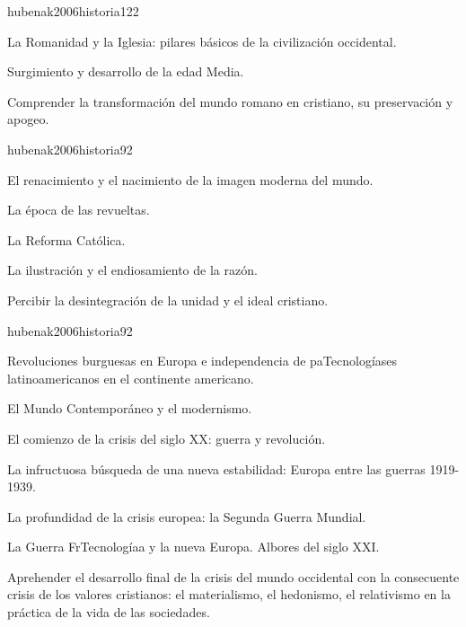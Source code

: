 \begin{syllabus}
\begin{unit}{}{hubenak2006historia}{12}{2}
\begin{topics}
	\item La Romanidad y la Iglesia: pilares básicos de la civilización occidental. 	
	\item Surgimiento y desarrollo de la edad Media.
\end{topics}
\begin{learningoutcomes}
	\item Comprender la transformación del mundo romano en cristiano, su preservación y apogeo.
\end{learningoutcomes}
\end{unit}

\begin{unit}{}{hubenak2006historia}{9}{2}
\begin{topics}
	\item El renacimiento y el nacimiento de la imagen moderna del mundo.  	
	\item La época de las revueltas. 	
	\item La Reforma Católica. 	
	\item La ilustración y el endiosamiento de la razón. 
\end{topics}
\begin{learningoutcomes}
	\item Percibir la desintegración de la unidad y el ideal cristiano.
\end{learningoutcomes}
\end{unit}

\begin{unit}{}{hubenak2006historia}{9}{2}
\begin{topics}
	\item Revoluciones burguesas en Europa e independencia de paTecnologíases latinoamericanos en el continente americano. 	
	\item El Mundo Contemporáneo y el modernismo. 	
	\item El comienzo de la crisis del siglo XX: guerra y revolución. 	
	\item La infructuosa búsqueda de una nueva estabilidad: Europa entre las guerras 1919-1939. 	
	\item La profundidad de la crisis europea: la Segunda Guerra Mundial. 	
	\item La Guerra FrTecnologíaa y la nueva Europa. Albores del siglo XXI.
\end{topics}
\begin{learningoutcomes}
	\item Aprehender el desarrollo final de la crisis del mundo occidental con la consecuente crisis de los valores cristianos: el materialismo, el hedonismo, el relativismo en la práctica de la vida de las sociedades. 
\end{learningoutcomes}
\end{unit}


\end{syllabus}

